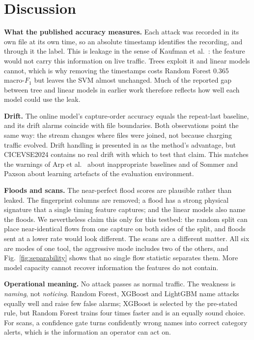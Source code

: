 \documentclass[conference]{IEEEtran}
\begin{document}
\section{Discussion}
\label{sec:discussion}

\textbf{What the published accuracy measures.} Each attack was recorded in its own file at its own time, so an absolute timestamp identifies the recording, and through it the label. This is leakage in the sense of Kaufman et al.\ \cite{b10}: the feature would not carry this information on live traffic. Trees exploit it and linear models cannot, which is why removing the timestamps costs Random Forest 0.365 macro-$F_1$ but leaves the SVM almost unchanged. Much of the reported gap between tree and linear models in earlier work therefore reflects how well each model could use the leak.

\textbf{Drift.} The online model's capture-order accuracy equals the repeat-last baseline, and its drift alarms coincide with file boundaries. Both observations point the same way: the stream changes where files were joined, not because charging traffic evolved. Drift handling is presented in \cite{b4} as the method's advantage, but CICEVSE2024 contains no real drift with which to test that claim. This matches the warnings of Arp et al.\ \cite{b11} about inappropriate baselines and of Sommer and Paxson \cite{b13} about learning artefacts of the evaluation environment.

\textbf{Floods and scans.} The near-perfect flood scores are plausible rather than leaked. The fingerprint columns are removed; a flood has a strong physical signature that a single timing feature captures; and the linear models also name the floods. We nevertheless claim this only for this testbed: the random split can place near-identical flows from one capture on both sides of the split, and floods sent at a lower rate would look different. The scans are a different matter. All six are modes of one tool, the aggressive mode includes two of the others, and Fig.~\ref{fig:separability} shows that no single flow statistic separates them. More model capacity cannot recover information the features do not contain.

\textbf{Operational meaning.} No attack passes as normal traffic. The weakness is \emph{naming}, not \emph{noticing}. Random Forest, XGBoost and LightGBM name attacks equally well and raise few false alarms; XGBoost is selected by the pre-stated rule, but Random Forest trains four times faster and is an equally sound choice. For scans, a confidence gate turns confidently wrong names into correct category alerts, which is the information an operator can act on.
\end{document}
